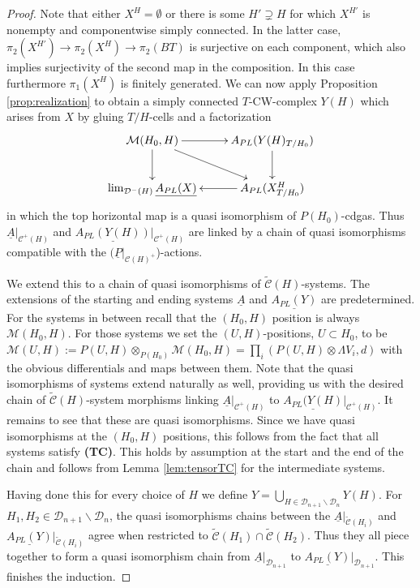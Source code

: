 \documentclass[12pt,a4paper]{article}
\theoremstyle{definition}
\begin{document}
\begin{proof}
Note that either $X^H=\emptyset$ or there is some $H'\supsetneq H$ for which $X^{H'}$ is nonempty and componentwise simply connected. In the latter case, $\pi_2(X^{H'})\rightarrow \pi_2(X^H)\rightarrow \pi_2(BT)$ is surjective on each component, which also implies surjectivity of the second map in the composition. In this case furthermore $\pi_1(X^H)$ is finitely generated. We can now apply Proposition \ref{prop:realization} to obtain a simply connected $T$-CW-complex $Y(H)$ which arises from $X$ by gluing $T/H$-cells and a factorization
\[\xymatrix{
\mathcal{M}(H_0,H)\ar[d]\ar[r]\ar[rd] & A_{PL}(Y(H)_{T/H_0})\ar[d]\\
\lim_{\mathcal{D}^-(H)}\underline{A_{PL}(X)} & \ar[l] A_{PL} (X^H_{T/H_0})
}\]
in which the top horizontal map is a quasi isomorphism of $P(H_0)$-cdgas.
Thus $\underline{A}|_{\mathcal{C}^+(H)}$ and $\underline{A_{PL}(Y(H))}|_{\mathcal{C}^+(H)}$ are linked by a chain of quasi isomorphisms compatible with the $(\underline{P}|_{\mathcal{C}(H)^+}$)-actions.


We extend this to a chain of quasi isomorphisms of $\tilde{\mathcal{C}}(H)$-systems. The extensions of the starting and ending systems $\underline{A}$ and $\underline{A_{PL}(Y)}$ are predetermined. For the systems in between recall that the $(H_0,H)$ position is always $\mathcal{M}(H_0,H)$. For those systems we set the $(U,H)$-positions, $U\subset H_0$, to be $\mathcal{M}(U,H):=P(U,H)\otimes_{P(H_0)} \mathcal{M}(H_0,H)=\prod_i(P(U,H)\otimes \Lambda V_i,d)$ with the obvious differentials and maps between them. Note that the quasi isomorphisms of systems extend naturally as well, providing us with the desired chain of $\tilde{\mathcal{C}}(H)$-system morphisms linking $\underline{A}|_{\mathcal{C}^+(H)}$ to $\underline{A_{PL}(Y(H)}|_{\mathcal{C}^+(H)}$. It remains to see that these are quasi isomorphisms. Since we have quasi isomorphisms at the $(H_0,H)$ positions, this follows from the fact that all systems satisfy \textbf{(TC)}. This holds by assumption at the start and the end of the chain and follows from Lemma \ref{lem:tensorTC} for the intermediate systems.

Having done this for every choice of $H$ we define $Y=\bigcup_{H\in \mathcal{D}_{n+1}\backslash \mathcal{D}_n} Y(H)$. For $H_1,H_2\in \mathcal{D}_{n+1}\backslash \mathcal{D}_n$, the quasi isomorphisms chains between the $\underline{A}|_{\tilde{\mathcal{C}}(H_i)}$ and $\underline{A_{PL}(Y)}|_{\tilde{\mathcal{C}}(H_i)}$ agree when restricted to
${\tilde{\mathcal{C}}(H_1)}\cap {\tilde{\mathcal{C}}(H_2)}$. Thus they all piece together to form a quasi isomorphism chain from $\underline{A}|_{\mathcal{D}_{n+1}}$ to $\underline{A_{PL}(Y)}|_{\mathcal{D}_{n+1}}$. This finishes the induction.


\end{proof}
\end{document}
